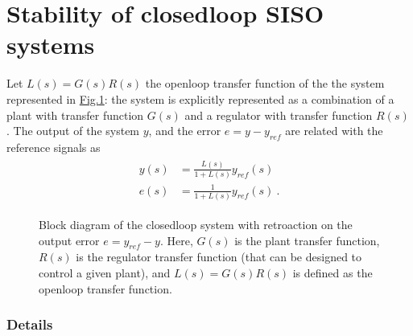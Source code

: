 \documentclass[letterpaper,10pt,english]{jupyterBook}
\begin{document}
\section{Stability of closed\sphinxhyphen{}loop SISO systems}
\label{\detokenize{ch/control/frequency-domain:stability-of-closed-loop-siso-systems}}\label{\detokenize{ch/control/frequency-domain:control-frequency-siso}}
\sphinxAtStartPar
Let \(L(s) = G(s) R(s)\) the open\sphinxhyphen{}loop transfer function of the the system represented in \hyperref[\detokenize{ch/control/frequency-domain:fig-nyquist-block}]{Fig.\@ \ref{\detokenize{ch/control/frequency-domain:fig-nyquist-block}}}: the system is explicitly represented as a combination of a plant with transfer function \(G(s)\) and a regulator with transfer function \(R(s)\). The output of the system \(y\), and the error \(e = y - y_{ref}\) are related with the reference signals as
\begin{equation}\label{equation:ch/control/frequency-domain:eq:nyquist:tfs}
\begin{split}\begin{aligned}
  y(s) & = \frac{L(s)}{1 + L(s)} y_{ref}(s) \\
  e(s) & = \frac{ 1  }{1 + L(s)} y_{ref}(s) \ .
\end{aligned}\end{split}
\end{equation}
\begin{figure}[htbp]
\centering
\capstart

\noindent{}
\caption{Block diagram of the closed\sphinxhyphen{}loop system with retroaction on the output error \(e = y_{ref} - y\). Here, \(G(s)\) is the plant transfer function, \(R(s)\) is the regulator transfer function (that can be designed to control a given plant), and \(L(s) = G(s) R(s)\) is defined as the open\sphinxhyphen{}loop transfer function.}\label{\detokenize{ch/control/frequency-domain:fig-nyquist-block}}\end{figure}
\subsubsection*{Details}
\end{document}

